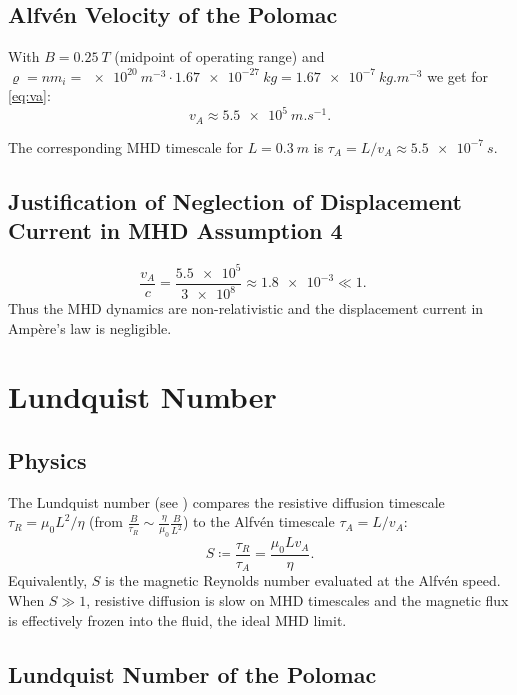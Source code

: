 \subsection{Alfv\'en Velocity of the Polomac}
\label{subsec: alfven velocity of polomac}

With $B = \SI{0.25}{T}$ (midpoint of operating range) and
$\varrho = n m_i = \SI{e20}{m^{-3}}\cdot\SI{1.67e-27}{kg}
= \SI{1.67e-7}{kg.m^{-3}}$ we get for \eqref{eq:va}:
\begin{equation*}
    v_A
    \approx \SI{5.5e5}{m.s^{-1}}.
\end{equation*}


The corresponding MHD timescale for $L = \SI{0.3}{m}$ is
$\tau_A = L/v_A \approx \SI{5.5e-7}{s}$.



\subsection*{Justification of Neglection of Displacement Current in MHD Assumption 4}


\[
    \frac{v_A}{c}
    = \frac{\num{5.5e5}}{\num{3e8}}
    \approx \num{1.8e-3} \ll 1. \quad
\]
Thus the MHD dynamics are non-relativistic and the displacement current in
Amp\`ere's law is negligible.



\section{Lundquist Number}
\label{sec:lundquist}

\subsection*{Physics}


The Lundquist number (see \cite{goldston1995}) compares the resistive diffusion timescale
$\tau_R = \mu_0 L^2/\eta$ (from $\frac{B}{\tau_R} \sim \frac{\eta}{\mu_0} \frac{B}{L^2}$)
 to the Alfv\'en timescale $\tau_A=L/v_A$:
\begin{equation}
    S \coloneqq \frac{\tau_R}{\tau_A} = \frac{\mu_0 L v_A}{\eta}.
    \label{eq:lundquist}
\end{equation}
Equivalently, $S$ is the magnetic Reynolds number evaluated at the
Alfv\'en speed.  When $S\gg1$, resistive diffusion is slow on MHD
timescales and the magnetic flux is effectively frozen into the
fluid, the ideal MHD limit.

\subsection{Lundquist Number of the Polomac}


